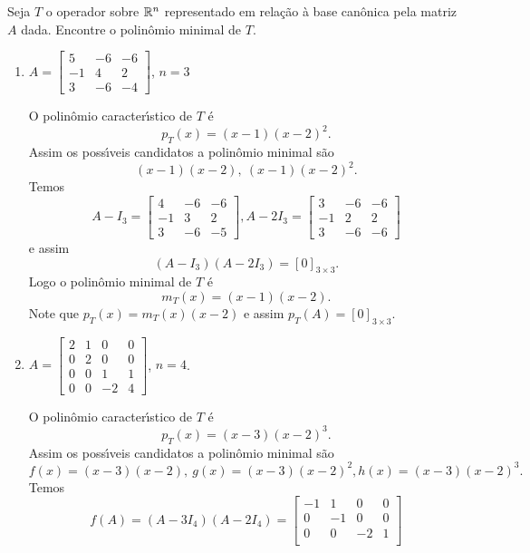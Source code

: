 \begin{exemplo}
	Seja $T$ o operador sobre $\mathbb{R}^n$ representado em rela\c{c}\~ao \`a base can\^onica pela matriz $A$ dada. Encontre o polin\^omio minimal de $T$.
	\begin{enumerate}
		\item $A = \begin{bmatrix}
			5 & -6 & -6\\
			-1 & 4 & 2\\
			3 & -6 & -4
		\end{bmatrix}$, $n = 3$
		\begin{solucao}
			O polin\^omio caracter{\'\i}stico de $T$ \'e
			\[
				p_T(x) = (x - 1)(x - 2)^2.
			\]
			Assim os poss{\'\i}veis candidatos a polin\^omio minimal s\~ao
			\[
				(x - 1)(x - 2), \ (x -1)(x - 2)^2.
			\]
			Temos
			\[
				A - I_3 = \begin{bmatrix}
					4 & -6 & -6\\
					-1 & 3 & 2\\
					3 & -6 & -5
				\end{bmatrix},
				A - 2I_3 = \begin{bmatrix}
					3 & -6 & -6\\
					-1 & 2 & 2\\
					3 & -6 & -6
				\end{bmatrix}
			\]
			e assim
			\[
				(A - I_3)(A - 2I_3) = [0]_{3 \times 3}.
			\]
			Logo o polin\^omio minimal de $T$ \'e
			\[
				m_T(x) = (x - 1)(x - 2).
			\]
			Note que $p_T(x) = m_T(x)(x - 2)$ e assim $p_T(A) = [0]_{3 \times 3}$.
		\end{solucao}
		\item $A = \begin{bmatrix}
			2 & 1 & 0 & 0\\
			0 & 2 & 0 & 0\\
			0 & 0 & 1 & 1\\
			0 & 0 & -2 & 4
		\end{bmatrix}$, $n = 4$.
		\begin{solucao}
			O polin\^omio caracter{\'\i}stico de $T$ \'e
			\[
				p_T(x) = (x - 3)(x - 2)^3.
			\]
			Assim os poss{\'\i}veis candidatos a polin\^omio minimal s\~ao
			\[
				f(x) = (x - 3)(x - 2), \ g(x) = (x -3)(x - 2)^2, h(x) = (x - 3)(x - 2)^3.
			\]
			Temos
			\[
				f(A) = (A - 3I_4)(A - 2I_4) = \begin{bmatrix}
					-1 & 1 & 0 & 0\\
					0 & -1 & 0 & 0\\
					0 & 0 & -2 & 1\\

\end{bmatrix}\]
\end{solucao}
\end{enumerate}
\end{exemplo}
